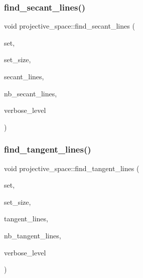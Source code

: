 \subsubsection{\texorpdfstring{find\+\_\+secant\+\_\+lines()}{find\_secant\_lines()}\hspace{0.1cm}{\footnotesize\ttfamily [2/2]}}
{\footnotesize\ttfamily void projective\+\_\+space\+::find\+\_\+secant\+\_\+lines (\begin{DoxyParamCaption}\item[{\mbox{\hyperlink{galois_8h_a09fddde158a3a20bd2dcadb609de11dc}{I\+NT}} $\ast$}]{set,  }\item[{\mbox{\hyperlink{galois_8h_a09fddde158a3a20bd2dcadb609de11dc}{I\+NT}}}]{set\+\_\+size,  }\item[{\mbox{\hyperlink{galois_8h_a09fddde158a3a20bd2dcadb609de11dc}{I\+NT}} $\ast$}]{secant\+\_\+lines,  }\item[{\mbox{\hyperlink{galois_8h_a09fddde158a3a20bd2dcadb609de11dc}{I\+NT}} \&}]{nb\+\_\+secant\+\_\+lines,  }\item[{\mbox{\hyperlink{galois_8h_a09fddde158a3a20bd2dcadb609de11dc}{I\+NT}}}]{verbose\+\_\+level }\end{DoxyParamCaption})}

\mbox{\label{classprojective__space_aafad8f113cd484b5af556546c9159b8d}} 
\subsubsection{\texorpdfstring{find\+\_\+tangent\+\_\+lines()}{find\_tangent\_lines()}}
{\footnotesize\ttfamily void projective\+\_\+space\+::find\+\_\+tangent\+\_\+lines (\begin{DoxyParamCaption}\item[{\mbox{\hyperlink{galois_8h_a09fddde158a3a20bd2dcadb609de11dc}{I\+NT}} $\ast$}]{set,  }\item[{\mbox{\hyperlink{galois_8h_a09fddde158a3a20bd2dcadb609de11dc}{I\+NT}}}]{set\+\_\+size,  }\item[{\mbox{\hyperlink{galois_8h_a09fddde158a3a20bd2dcadb609de11dc}{I\+NT}} $\ast$}]{tangent\+\_\+lines,  }\item[{\mbox{\hyperlink{galois_8h_a09fddde158a3a20bd2dcadb609de11dc}{I\+NT}} \&}]{nb\+\_\+tangent\+\_\+lines,  }\item[{\mbox{\hyperlink{galois_8h_a09fddde158a3a20bd2dcadb609de11dc}{I\+NT}}}]{verbose\+\_\+level }\end{DoxyParamCaption})}

